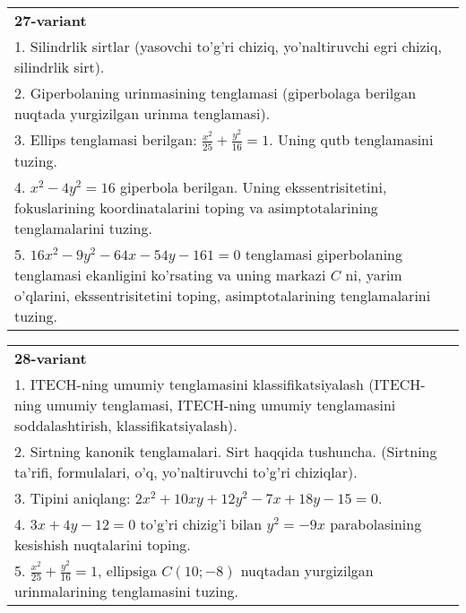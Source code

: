\documentclass{article}
\begin{document}
\begin{tabular}{m{17cm}}
\textbf{27-variant}\\
1. Silindrlik sirtlar (yasovchi to'g'ri chiziq, yo'naltiruvchi egri chiziq, silindrlik sirt).\\

2. Giperbolaning urinmasining tenglamasi (giperbolaga berilgan nuqtada yurgizilgan urinma tenglamasi).\\

3. Ellips tenglamasi berilgan: $\frac{x^2}{25}+\frac{y^2}{16}=1$. Uning qutb tenglamasini tuzing.\\

4. $x^{2} - 4y^{2} = 16$ giperbola berilgan. Uning ekssentrisitetini, fokuslarining koordinatalarini toping va asimptotalarining tenglamalarini tuzing.\\

5. $16x^{2} - 9y^{2} - 64x - 54y - 161 = 0$ tenglamasi giperbolaning tenglamasi ekanligini ko'rsating va uning markazi $C$ ni, yarim o'qlarini, ekssentrisitetini toping, asimptotalarining tenglamalarini tuzing.  
\end{tabular}
\vspace{1cm}


\begin{tabular}{m{17cm}}
\textbf{28-variant}\\
1. ITECH-ning umumiy tenglamasini klassifikatsiyalash (ITECH-ning umumiy tenglamasi, ITECH-ning umumiy tenglamasini soddalashtirish, klassifikatsiyalash).\\

2. Sirtning kanonik tenglamalari. Sirt haqqida tushuncha. (Sirtning ta'rifi, formulalari, o'q, yo'naltiruvchi to'g'ri chiziqlar).\\

3. Tipini aniqlang: $2x^{2}+10xy+12y^{2}-7x+18y-15=0$.\\

4. $3x + 4y - 12 = 0$ to'g'ri chizig'i bilan $y^{2} = - 9x$ parabolasining kesishish nuqtalarini toping.  \\

5. $\frac{x^{2}}{25} + \frac{y^{2}}{16} = 1$, ellipsiga $C(10; - 8)$ nuqtadan yurgizilgan urinmalarining tenglamasini tuzing.  
\end{tabular}
\vspace{1cm}
\end{document}
